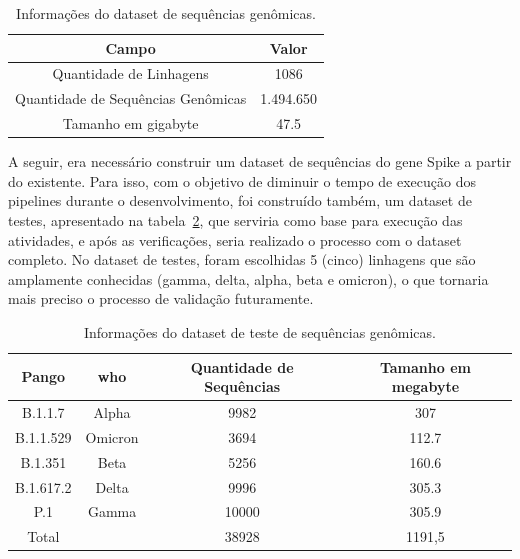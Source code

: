 \begin{table}[htb]
  \caption{Informações do dataset de sequências genômicas.}
  \begin{center}
    \begin{tabular}{|c|c|}
      \hline
      Campo                              & Valor     \\
      \hline
      Quantidade de Linhagens            & 1086      \\
      Quantidade de Sequências Genômicas & 1.494.650 \\
      Tamanho em \gls{gigabyte}          & 47.5      \\
      \hline
    \end{tabular}
  \end{center}
  \label{tab:datasetGenomas}
\end{table}

A seguir, era necessário construir um dataset de sequências do gene Spike a partir do existente. Para isso, com o objetivo de diminuir o tempo de execução dos pipelines durante o desenvolvimento, foi construído também, um dataset de testes, apresentado na tabela~\ref{tab:datasetGenomasTeste}, que serviria como base para execução das atividades, e após as verificações, seria realizado o processo com o dataset completo. No dataset de testes, foram escolhidas 5 (cinco) linhagens que são amplamente conhecidas (gamma, delta, alpha, beta e omicron), o que tornaria mais preciso o processo de validação futuramente.

\begin{table}[htb]
  \caption{Informações do dataset de teste de sequências genômicas.}
  \begin{center}
    \begin{tabular}{|c|c|c|c|}
      \hline
      Pango     & \gls{who} & Quantidade de Sequências & Tamanho em \gls{megabyte} \\
      \hline
      B.1.1.7   & Alpha     & 9982                     & 307                       \\
      B.1.1.529 & Omicron   & 3694                     & 112.7                     \\
      B.1.351   & Beta      & 5256                     & 160.6                     \\
      B.1.617.2 & Delta     & 9996                     & 305.3                     \\
      P.1       & Gamma     & 10000                    & 305.9                     \\
      \hline
      Total     &           & 38928                    & 1191,5                    \\
      \hline
    \end{tabular}
  \end{center}
  \label{tab:datasetGenomasTeste}
\end{table}

